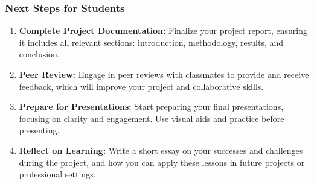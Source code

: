 \documentclass[aspectratio=169]{beamer}
\begin{document}
\begin{frame}[fragile]
  \frametitle{Next Steps for Students}
  \begin{enumerate}
    \item \textbf{Complete Project Documentation:}  
    Finalize your project report, ensuring it includes all relevant sections: introduction, methodology, results, and conclusion.
    
    \item \textbf{Peer Review:}  
    Engage in peer reviews with classmates to provide and receive feedback, which will improve your project and collaborative skills.
    
    \item \textbf{Prepare for Presentations:}  
    Start preparing your final presentations, focusing on clarity and engagement. Use visual aids and practice before presenting.
    
    \item \textbf{Reflect on Learning:}  
    Write a short essay on your successes and challenges during the project, and how you can apply these lessons in future projects or professional settings.
  \end{enumerate}
\end{frame}
\end{document}

